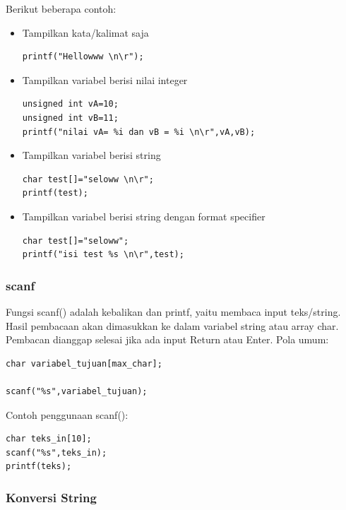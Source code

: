 \documentclass[12pt,]{article}
\begin{document}
	Berikut beberapa contoh:
	\begin{itemize}
		\item Tampilkan kata/kalimat saja
		\begin{verbatim}
printf("Hellowww \n\r");
		\end{verbatim}
		
		\item Tampilkan variabel berisi nilai integer
		\begin{verbatim}
unsigned int vA=10;
unsigned int vB=11;
printf("nilai vA= %i dan vB = %i \n\r",vA,vB);
		\end{verbatim}
		
		\item Tampilkan variabel berisi string
		\begin{verbatim}
char test[]="seloww \n\r";
printf(test);
		\end{verbatim}
		
		\item Tampilkan variabel berisi string dengan format specifier
		\begin{verbatim}
char test[]="seloww";
printf("isi test %s \n\r",test);
		\end{verbatim}
	\end{itemize}

	\subsubsection{scanf}
	
	Fungsi scanf() adalah kebalikan dan printf, yaitu membaca input teks/string.
	Hasil pembacaan akan dimasukkan ke dalam variabel string atau array char.
	Pembacan dianggap selesai jika ada input Return atau Enter.
	Pola umum:
	\begin{verbatim}
char variabel_tujuan[max_char];

scanf("%s",variabel_tujuan);
	\end{verbatim}
	
	Contoh penggunaan scanf():
	\begin{verbatim}
char teks_in[10];
scanf("%s",teks_in);
printf(teks);
	\end{verbatim}
	
	\subsubsection{Konversi String}
	
\end{document}
